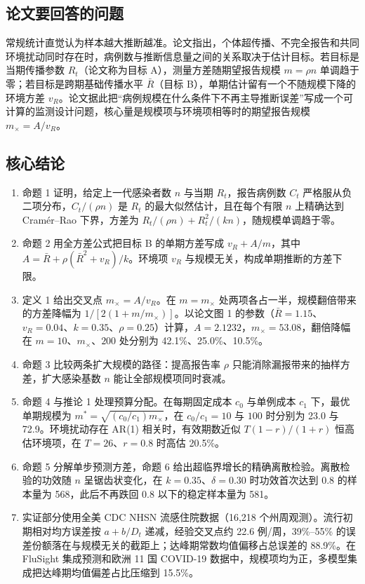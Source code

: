 \subsection{论文要回答的问题}

常规统计直觉认为样本越大推断越准。论文指出，个体超传播、不完全报告和共同环境扰动同时存在时，病例数与推断信息量之间的关系取决于估计目标。若目标是当期传播参数 $R_t$（论文称为目标 A），测量方差随期望报告规模 $m=\rho n$ 单调趋于零；若目标是跨期基础传播水平 $\bar R$（目标 B），单期估计留有一个不随规模下降的环境方差 $v_R$。论文据此把“病例规模在什么条件下不再主导推断误差”写成一个可计算的监测设计问题，核心量是规模项与环境项相等时的期望报告规模 $m_\times=A/v_R$。

\subsection{核心结论}

\begin{enumerate}
\item 命题 1 证明，给定上一代感染者数 $n$ 与当期 $R_t$，报告病例数 $C_t$ 严格服从负二项分布，$C_t/(\rho n)$ 是 $R_t$ 的最大似然估计，且在每个有限 $n$ 上精确达到 Cram\'er--Rao 下界，方差为 $R_t/(\rho n)+R_t^2/(kn)$，随规模单调趋于零。
\item 命题 2 用全方差公式把目标 B 的单期方差写成 $v_R+A/m$，其中 $A=\bar R+\rho(\bar R^2+v_R)/k$。环境项 $v_R$ 与规模无关，构成单期推断的方差下限。
\item 定义 1 给出交叉点 $m_\times=A/v_R$。在 $m=m_\times$ 处两项各占一半，规模翻倍带来的方差降幅为 $1/[2(1+m/m_\times)]$。以论文图 1 的参数（$\bar R=1.15$、$v_R=0.04$、$k=0.35$、$\rho=0.25$）计算，$A=2.1232$，$m_\times=53.08$，翻倍降幅在 $m=10$、$m_\times$、$200$ 处分别为 42.1\%、25.0\%、10.5\%。
\item 命题 3 比较两条扩大规模的路径：提高报告率 $\rho$ 只能消除漏报带来的抽样方差，扩大感染基数 $n$ 能让全部规模项同时衰减。
\item 命题 4 与推论 1 处理预算分配。在每期固定成本 $c_0$ 与单例成本 $c_1$ 下，最优单期规模为 $m^*=\sqrt{(c_0/c_1)m_\times}$，在 $c_0/c_1=10$ 与 $100$ 时分别为 23.0 与 72.9。环境扰动存在 AR(1) 相关时，有效期数近似 $T(1-r)/(1+r)$ 恒高估环境项，在 $T=26$、$r=0.8$ 时高估 20.5\%。
\item 命题 5 分解单步预测方差，命题 6 给出超临界增长的精确离散检验。离散检验的功效随 $n$ 呈锯齿状变化，在 $k=0.35$、$\delta=0.30$ 时功效首次达到 0.8 的样本量为 568，此后不再跌回 0.8 以下的稳定样本量为 581。
\item 实证部分使用全美 CDC NHSN 流感住院数据（16,218 个州周观测）。流行初期相对均方误差按 $a+b/D_t$ 递减，经验交叉点约 22.6 例/周，39\%--55\% 的误差份额落在与规模无关的截距上；达峰期常数均值偏移占总误差的 88.9\%。在 FluSight 集成预测和欧洲 11 国 COVID-19 数据中，规模项均为正，多模型集成把达峰期均值偏差占比压缩到 15.5\%。
\end{enumerate}

